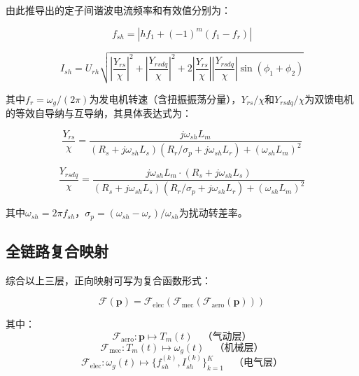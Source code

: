 \documentclass[withoutpreface,bwprint]{cumcmthesis}
\begin{document}
由此推导出的定子间谐波电流频率和有效值分别为：

\begin{equation}
\boxed{f_{sh} = \left|h f_1 + (-1)^m(f_1 - f_r)\right|}
\label{eq:ish_freq}
\end{equation}

\begin{equation}
I_{sh} = U_{rh}\sqrt{\left|\frac{Y_{rs}}{\chi}\right|^2 + \left|\frac{Y_{rsdq}}{\chi}\right|^2 + 2\left|\frac{Y_{rs}}{\chi}\right|\left|\frac{Y_{rsdq}}{\chi}\right|\sin(\phi_1 + \phi_2)}
\label{eq:ish_mag}
\end{equation}

其中$f_r=\omega_g/(2\pi)$为发电机转速（含扭振振荡分量），$Y_{rs}/\chi$和$Y_{rsdq}/\chi$为双馈电机的等效自导纳与互导纳，其具体表达式为：

\begin{equation}
\frac{Y_{rs}}{\chi} = \frac{j\omega_{sh}L_m}{(R_s+j\omega_{sh}L_s)(R_r/\sigma_p+j\omega_{sh}L_r)+(\omega_{sh}L_m)^2}
\label{eq:self_admittance}
\end{equation}

\begin{equation}
\frac{Y_{rsdq}}{\chi} = \frac{j\omega_{sh}L_m\cdot(R_s+j\omega_{sh}L_s)}{(R_s+j\omega_{sh}L_s)(R_r/\sigma_p+j\omega_{sh}L_r)+(\omega_{sh}L_m)^2}
\label{eq:mutual_admittance}
\end{equation}

其中$\omega_{sh}=2\pi f_{sh}$，$\sigma_p=(\omega_{sh}-\omega_r)/\omega_{sh}$为扰动转差率。

\subsection{全链路复合映射}

综合以上三层，正向映射可写为复合函数形式：

\begin{equation}
\mathcal{F}(\mathbf{p}) = \mathcal{F}_{\mathrm{elec}}(\mathcal{F}_{\mathrm{mec}}(\mathcal{F}_{\mathrm{aero}}(\mathbf{p})))
\label{eq:composite}
\end{equation}

其中：
\begin{equation}
\mathcal{F}_{\mathrm{aero}}: \mathbf{p} \mapsto T_m(t) \quad \text{（气动层）}
\end{equation}
\begin{equation}
\mathcal{F}_{\mathrm{mec}}: T_m(t) \mapsto \omega_g(t) \quad \text{（机械层）}
\end{equation}
\begin{equation}
\mathcal{F}_{\mathrm{elec}}: \omega_g(t) \mapsto \{f_{sh}^{(k)}, I_{sh}^{(k)}\}_{k=1}^K \quad \text{（电气层）}
\end{equation}
\end{document}
